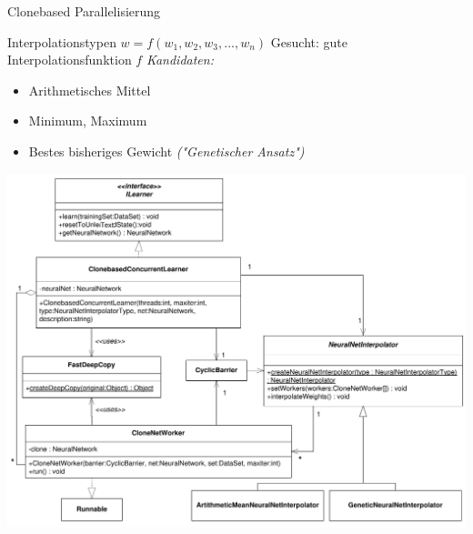 \documentclass[18pt]{beamer}
\begin{document}
\begin{frame}[allowframebreaks]{Clonebased Parallelisierung}
	\framebreak
		\begin{block}{Interpolationstypen}
			$w = f(w_1,w_2,w_3,...,w_n)$
			\newline
			Gesucht: gute Interpolationsfunktion $f$
			\newline
			\newline
			\emph{Kandidaten:}
			\begin{itemize}
				\item Arithmetisches Mittel
				\item Minimum, Maximum
				\item Bestes bisheriges Gewicht \emph{("Genetischer Ansatz")}
			\end{itemize}
		\end{block}
		
	\framebreak
	\begin{center}
		\includegraphics[height=0.8\textheight]{Grafiken/Clonebased_classdiagram}	
	\end{center}
	\framebreak
	\begin{center}

\end{center}
\end{frame}
\end{document}
